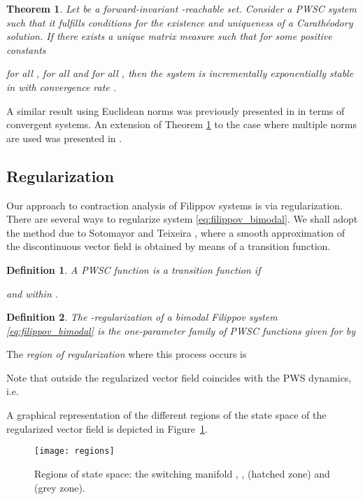 \documentclass[twocolumn]{autart}
\newtheorem{theorem}{Theorem}
\newtheorem{definition}{Definition}
\begin{document}
\begin{theorem}
\label{thm:contracting_PWSC}
\citep{di2014contraction} Let  be a forward-invariant -reachable set. Consider a PWSC system such that it fulfills conditions for the existence and uniqueness of a Carath\'eodory solution. If there exists a unique matrix measure such that for some positive constants 

for all , for all  and for all , then the system is incrementally exponentially stable in  with convergence rate .
\end{theorem}
A similar result using Euclidean norms was previously presented in \citep[Theorem 2.33]{pavlov2006uniform} in terms of convergent systems. An extension of Theorem \ref{thm:contracting_PWSC} to the case where multiple norms are used was presented in \citep{lu2015switching,lu2015contraction}.
\subsection{Regularization}
Our approach to contraction analysis of Filippov systems is via regularization. There are several ways to regularize system \eqref{eq:filippov_bimodal}. We shall adopt the method due to Sotomayor and Teixeira \citep{sotomayor1996regularization}, where a smooth approximation of the discontinuous vector field is obtained by means of a transition function.
\begin{definition}
A PWSC function  is a \emph{transition function} if

and  within .
\end{definition}
\begin{definition}
The \emph{-regularization} of a bimodal Filippov system \eqref{eq:filippov_bimodal} is the one-parameter family of PWSC functions   given for  by

\end{definition}
The \emph{region of regularization} where this process occurs is

Note that outside  the regularized vector field  coincides with the PWS dynamics, i.e.

A graphical representation of the different regions of the state space of the regularized vector field  is depicted in Figure~\ref{fig:regions}.
\begin{figure}[!t]
\begin{center}
\texttt{[image: regions]}
\caption{Regions of state space: the switching manifold , 
,  (hatched zone) and  (grey zone).}
\label{fig:regions}
\end{center}
\end{figure}
\end{document}
